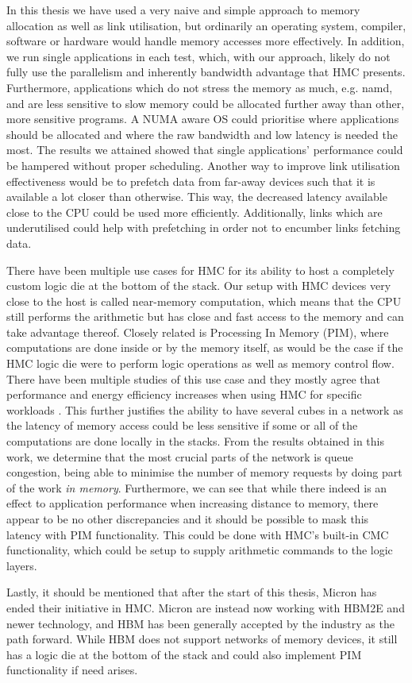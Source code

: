 In this thesis we have used a very naive and simple approach to memory allocation as well as link utilisation, but ordinarily an operating system, compiler, software or hardware would handle memory accesses more effectively. In addition, we run single applications in each test, which, with our approach, likely do not fully use the parallelism and inherently bandwidth advantage that HMC presents. Furthermore, applications which do not stress the memory as much, e.g. namd, and are less sensitive to slow memory could be allocated further away than other, more sensitive programs. A NUMA aware OS could prioritise where applications should be allocated and where the raw bandwidth and low latency is needed the most. The results we attained showed that single applications' performance could be hampered without proper scheduling. Another way to improve link utilisation effectiveness would be to prefetch data from far-away devices such that it is available a lot closer than otherwise. This way, the decreased latency available close to the CPU could be used more efficiently. Additionally, links which are underutilised could help with prefetching in order not to encumber links fetching data. 
\bigskip

There have been multiple use cases for HMC for its ability to host a completely custom logic die at the bottom of the stack. Our setup with HMC devices very close to the host is called near-memory computation, which means that the CPU still performs the arithmetic but has close and fast access to the memory and can take advantage thereof. Closely related is Processing In Memory (PIM), where computations are done inside or by the memory itself, as would be the case if the HMC logic die were to perform logic operations as well as memory control flow. There have been multiple studies of this use case and they mostly agree that performance and energy efficiency increases when using HMC for specific workloads \cite{7917248, Min:2019:NEH:3287624.3287642, 7804052, oliveira2017nim}. This further justifies the ability to have several cubes in a network as the latency of memory access could be less sensitive if some or all of the computations are done locally in the stacks. From the results obtained in this work, we determine that the most crucial parts of the network is queue congestion, being able to minimise the number of memory requests by doing part of the work \emph{in memory}. Furthermore, we can see that while there indeed is an effect to application performance when increasing distance to memory, there appear to be no other discrepancies and it should be possible to mask this latency with PIM functionality. This could be done with HMC's built-in CMC functionality, which could be setup to supply arithmetic commands to the logic layers.
\bigskip

Lastly, it should be mentioned that after the start of this thesis, Micron has ended their initiative in HMC. Micron are instead now working with HBM2E and newer technology, and HBM has been generally accepted by the industry as the path forward. While HBM does not support networks of memory devices, it still has a logic die at the bottom of the stack and could also implement PIM functionality if need arises.